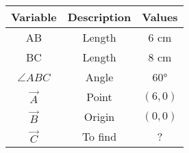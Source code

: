 
\begin{tabular}[12pt]{ |c| c| c|}
    \hline
    \textbf{Variable} & \textbf{Description} & \textbf{Values} \\ 
    \hline
    AB & Length & 6 cm \\
    \hline
    BC & Length & 8 cm \\
    \hline
    $\angle ABC$ & Angle & \ang{60}\\
    \hline 
    $\vec{A}$ & Point & $(6,0)$ \\
    \hline
    $\vec{B}$ & Origin & $(0,0)$ \\
    \hline
    $\vec{C}$ & To find & ? \\
    \hline
    \end{tabular}

